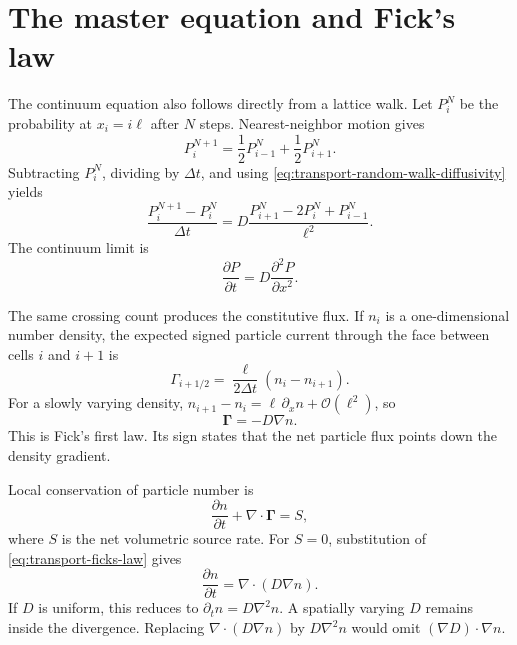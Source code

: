 \section{The master equation and Fick's law}

The continuum equation also follows directly from a lattice walk.  Let $P_i^N$
be the probability at $x_i=i\ell$ after $N$ steps.  Nearest-neighbor motion
gives
\begin{equation}
  P_i^{N+1}=\frac12P_{i-1}^N+\frac12P_{i+1}^N.
  \label{eq:transport-master-equation}
\end{equation}
Subtracting $P_i^N$, dividing by $\Delta t$, and using
\cref{eq:transport-random-walk-diffusivity} yields
\begin{equation}
  \frac{P_i^{N+1}-P_i^N}{\Delta t}
  =D\frac{P_{i+1}^N-2P_i^N+P_{i-1}^N}{\ell^2}.
  \label{eq:transport-master-centered}
\end{equation}
The continuum limit is
\begin{equation}
  \boxed{\frac{\partial P}{\partial t}=D\frac{\partial^2P}{\partial x^2}.}
  \label{eq:transport-diffusion-equation-probability}
\end{equation}

The same crossing count produces the constitutive flux.  If $n_i$ is a
one-dimensional number density, the expected signed particle current through
the face between cells $i$ and $i+1$ is
\begin{equation}
  \Gamma_{i+1/2}
  =\frac{\ell}{2\Delta t}(n_i-n_{i+1}).
  \label{eq:transport-discrete-face-flux}
\end{equation}
For a slowly varying density,
$n_{i+1}-n_i=\ell\,\partial_xn+\mathcal O(\ell^2)$, so
\begin{equation}
  \boxed{\bm\Gamma=-D\nabla n.}
  \label{eq:transport-ficks-law}
\end{equation}
This is Fick's first law.  Its sign states that the net particle flux points
down the density gradient.

Local conservation of particle number is
\begin{equation}
  \frac{\partial n}{\partial t}+\nabla\cdot\bm\Gamma=S,
  \label{eq:transport-number-continuity}
\end{equation}
where $S$ is the net volumetric source rate.  For $S=0$, substitution of
\cref{eq:transport-ficks-law} gives
\begin{equation}
  \boxed{
  \frac{\partial n}{\partial t}
  =\nabla\cdot(D\nabla n).
  }
  \label{eq:transport-ficks-second-law}
\end{equation}
If $D$ is uniform, this reduces to
$\partial_tn=D\nabla^2n$.  A spatially varying $D$ remains inside the
divergence.  Replacing $\nabla\cdot(D\nabla n)$ by $D\nabla^2n$ would omit
$(\nabla D)\cdot\nabla n$.


